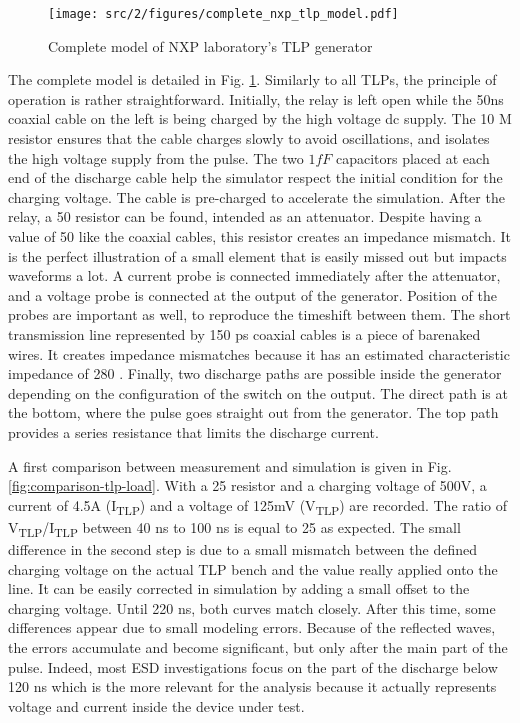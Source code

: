 \begin{figure}[!h]
  \centering
  \texttt{[image: src/2/figures/complete\_nxp\_tlp\_model.pdf]}
  \caption{Complete model of NXP laboratory's TLP generator}
  \label{fig:complete-tlp-model}
\end{figure}

The complete model is detailed in Fig. \ref{fig:complete-tlp-model}.
Similarly to all TLPs, the principle of operation is rather straightforward.
Initially, the relay is left open while the 50ns coaxial cable on the left is being charged by the high voltage \gls{dc} supply.
The 10 M\textOmega{} resistor ensures that the cable charges slowly to avoid oscillations, and isolates the high voltage supply from the pulse.
The two $1 fF$ capacitors placed at each end of the discharge cable help the simulator respect the initial condition for the charging voltage.
The cable is pre-charged to accelerate the simulation.
After the relay, a 50 \textOmega{} resistor can be found, intended as an attenuator.
Despite having a value of 50\textOmega{} like the coaxial cables, this resistor creates an impedance mismatch.
It is the perfect illustration of a small element that is easily missed out but impacts waveforms a lot.
A current probe is connected immediately after the attenuator, and a voltage probe is connected at the output of the generator.
Position of the probes are important as well, to reproduce the timeshift between them.
The short transmission line represented by 150 ps coaxial cables is a piece of barenaked wires.
It creates impedance mismatches because it has an estimated characteristic impedance of 280 \textOmega{}.
Finally, two discharge paths are possible inside the generator depending on the configuration of the switch on the output.
The direct path is at the bottom, where the pulse goes straight out from the generator.
The top path provides a series resistance that limits the discharge current.

A first comparison between measurement and simulation is given in Fig. \ref{fig:comparison-tlp-load}.
With a 25\textOmega{} resistor and a charging voltage of 500V, a current of 4.5A (I\textsubscript{TLP}) and a voltage of 125mV (V\textsubscript{TLP}) are recorded.
The ratio of V\textsubscript{TLP}/I\textsubscript{TLP} between 40 ns to 100 ns is equal to 25\textOmega{} as expected.
The small difference in the second step is due to a small mismatch between the defined charging voltage on the actual TLP bench and the value really applied onto the line.
It can be easily corrected in simulation by adding a small offset to the charging voltage.
Until 220 ns, both curves match closely.
After this time, some differences appear due to small modeling errors.
Because of the reflected waves, the errors accumulate and become significant, but only after the main part of the pulse.
Indeed, most ESD investigations focus on the part of the discharge below 120 ns which is the more relevant for the analysis because it actually represents voltage and current inside the device under test.


